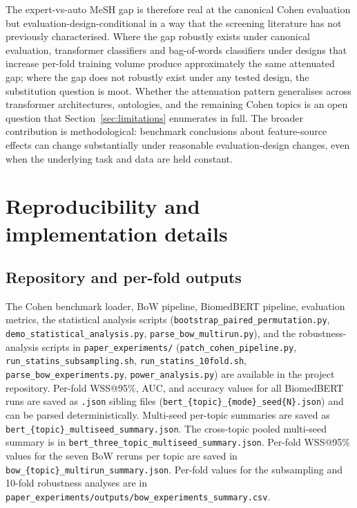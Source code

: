 \documentclass{article}
\begin{document}
The expert-vs-auto MeSH gap is therefore real at the canonical Cohen evaluation but evaluation-design-conditional in a way that the screening literature has not previously characterised. Where the gap robustly exists under canonical evaluation, transformer classifiers and bag-of-words classifiers under designs that increase per-fold training volume produce approximately the same attenuated gap; where the gap does not robustly exist under any tested design, the substitution question is moot. Whether the attenuation pattern generalises across transformer architectures, ontologies, and the remaining Cohen topics is an open question that Section~\ref{sec:limitations} enumerates in full. The broader contribution is methodological: benchmark conclusions about feature-source effects can change substantially under reasonable evaluation-design changes, even when the underlying task and data are held constant.





\appendix

\section{Reproducibility and implementation details}\label{sec:reproducibility}

\subsection{Repository and per-fold outputs}

The Cohen benchmark loader, BoW pipeline, BiomedBERT pipeline, evaluation metrics, the statistical analysis scripts (\texttt{bootstrap\_paired\_permutation.py}, \texttt{demo\_statistical\_analysis.py}, \texttt{parse\_bow\_multirun.py}), and the robustness-analysis scripts in \texttt{paper\_experiments/} (\texttt{patch\_cohen\_pipeline.py}, \texttt{run\_statins\_subsampling.sh}, \texttt{run\_statins\_10fold.sh}, \texttt{parse\_bow\_experiments.py}, \texttt{power\_analysis.py}) are available in the project repository. Per-fold WSS@95\%, AUC, and accuracy values for all BiomedBERT runs are saved as \texttt{.json} sibling files (\texttt{bert\_\{topic\}\_\{mode\}\_seed\{N\}.json}) and can be parsed deterministically. Multi-seed per-topic summaries are saved as \texttt{bert\_\{topic\}\_multiseed\_summary.json}. The cross-topic pooled multi-seed summary is in \texttt{bert\_three\_topic\_multiseed\_summary.json}. Per-fold WSS@95\% values for the seven BoW reruns per topic are saved in \texttt{bow\_\{topic\}\_multirun\_summary.json}. Per-fold values for the subsampling and 10-fold robustness analyses are in \texttt{paper\_experiments/outputs/bow\_experiments\_summary.csv}.
\end{document}
